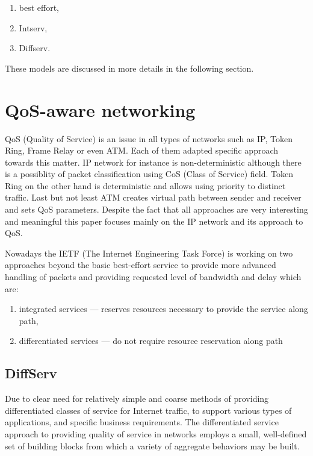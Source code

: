 \documentclass[11pt]{book}
\begin{document}
	\begin{enumerate}
    \item best effort,
		\item Intserv,
		\item Diffserv.
	\end{enumerate}
	
	These models are discussed in more details in the following section.
	

    \section{QoS-aware networking}

	  QoS (Quality of Service) is an issue in all types of networks such as IP, Token Ring, Frame Relay or even ATM. Each of them
	  adapted specific approach towards this matter. IP network for instance is non-deterministic although there is
	  a possiblity of packet classification using CoS (Class of Service) field. Token Ring on the other hand is deterministic
	  and allows using priority to distinct traffic. Last but not least ATM creates virtual path between sender and receiver and sets
	  QoS parameters. Despite the fact that all approaches are very interesting and meaningful this paper focuses mainly on the IP 
	  network and its approach to QoS.

	  Nowadays the IETF (The Internet Engineering Task Force) is working on two approaches
	  beyond the basic best-effort service to provide more advanced handling of packets and providing requested level 
	  of bandwidth and delay which are:

    \begin{enumerate}
      \item integrated services --- reserves resources necessary to provide the service along path,
      \item differentiated services --- do not require resource reservation along path
    \end{enumerate}
	
		\subsection{DiffServ}
		
			Due to clear need for relatively simple and coarse methods of providing differentiated classes
			of service for Internet traffic, to support various types of applications, and specific business
			requirements. The differentiated service approach to providing quality of service in networks 
			employs a small, well-defined set of building blocks from which a variety of aggregate behaviors
			may be built. \cite{qos}
			
\end{document}
